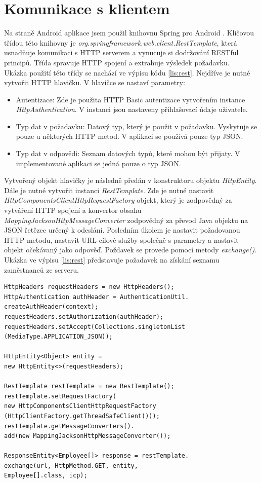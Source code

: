 \documentclass{diplomka}
\begin{document}
\section{Komunikace s klientem}
Na straně Android aplikace jsem použil knihovnu Spring pro Android \cite{springandroid}. Klíčovou třídou této knihovny je \emph{org.springframework.web.client.RestTemplate}, která usnadňuje komunikaci s HTTP serverem a vynucuje si dodržování RESTful principů. Třída spravuje HTTP spojení a extrahuje výsledek požadavku.\\ \indent
Ukázka použití této třídy se nachází ve výpisu kódu \ref{lis:rest}. Nejdříve je nutné vytvořit HTTP hlavičku. V hlavičce se nastaví parametry: 
\begin{itemize}[noitemsep,nolistsep]
\item Autentizace: Zde je použita HTTP Basic autentizace vytvořením instance \emph{HttpAuthentication}. V instanci jsou nastaveny přihlašovací údaje uživatele.
\item Typ dat v požadavku: Datový typ, který je použit v požadavku. Vyskytuje se pouze u některých HTTP metod. V aplikaci se používá pouze typ JSON.
\item Typ dat v odpovědi: Seznam datových typů, které mohou být přijaty. V implementované aplikaci se jedná pouze o typ JSON.
\end{itemize}
Vytvořený objekt hlavičky je následně předán v konstruktoru objektu \emph{HttpEntity}. Dále je nutné vytvořit instanci \emph{RestTemplate}. Zde je nutné nastavit \emph{HttpComponentsClientHttpRequestFactory} objekt, který je zodpovědný za vytváření HTTP spojení a konvertor obsahu \emph{MappingJacksonHttpMessageConverter} zodpovědný za převod Java objektu na JSON řetězec určený k odeslání. Posledním úkolem je nastavit požadovanou HTTP metodu, nastavit URL cílové služby společně s parametry a nastavit objekt očekávaný jako odpověď. Poždavek se provede pomocí metody \emph{exchange()}. Ukázka ve výpisu \ref{lis:rest} představuje požadavek na získání seznamu zaměstnanců ze serveru.

\begin{lstlisting}[label=lis:rest, caption=Ukázka použití RestTemplate]
HttpHeaders requestHeaders = new HttpHeaders();
HttpAuthentication authHeader = AuthenticationUtil.
createAuthHeader(context);
requestHeaders.setAuthorization(authHeader);
requestHeaders.setAccept(Collections.singletonList
(MediaType.APPLICATION_JSON));

HttpEntity<Object> entity = 
new HttpEntity<>(requestHeaders);

RestTemplate restTemplate = new RestTemplate();
restTemplate.setRequestFactory(
new HttpComponentsClientHttpRequestFactory
(HttpClientFactory.getThreadSafeClient()));
restTemplate.getMessageConverters().
add(new MappingJacksonHttpMessageConverter());

ResponseEntity<Employee[]> response = restTemplate.
exchange(url, HttpMethod.GET, entity, 
Employee[].class, icp);
\end{lstlisting}
\end{document}
